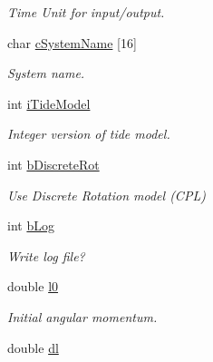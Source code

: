 \begin{DoxyCompactItemize}
\begin{DoxyCompactList}\small\item\em Time Unit for input/output. \end{DoxyCompactList}\item 
\hypertarget{struct_p_a_r_a_m_ad4a7df6fdd558d6fe9bbc6c3797d45d7}{}char \hyperlink{struct_p_a_r_a_m_ad4a7df6fdd558d6fe9bbc6c3797d45d7}{c\+System\+Name} \mbox{[}16\mbox{]}\label{struct_p_a_r_a_m_ad4a7df6fdd558d6fe9bbc6c3797d45d7}

\begin{DoxyCompactList}\small\item\em System name. \end{DoxyCompactList}\item 
\hypertarget{struct_p_a_r_a_m_ae7652abf8bba7206853f773eceb37e5e}{}int \hyperlink{struct_p_a_r_a_m_ae7652abf8bba7206853f773eceb37e5e}{i\+Tide\+Model}\label{struct_p_a_r_a_m_ae7652abf8bba7206853f773eceb37e5e}

\begin{DoxyCompactList}\small\item\em Integer version of tide model. \end{DoxyCompactList}\item 
\hypertarget{struct_p_a_r_a_m_aaf55dbd426e9edc0e77ae7139a7216e7}{}int \hyperlink{struct_p_a_r_a_m_aaf55dbd426e9edc0e77ae7139a7216e7}{b\+Discrete\+Rot}\label{struct_p_a_r_a_m_aaf55dbd426e9edc0e77ae7139a7216e7}

\begin{DoxyCompactList}\small\item\em Use Discrete Rotation model (C\+P\+L) \end{DoxyCompactList}\item 
\hypertarget{struct_p_a_r_a_m_afcb8dca240e755f4265686883f8d64a8}{}int \hyperlink{struct_p_a_r_a_m_afcb8dca240e755f4265686883f8d64a8}{b\+Log}\label{struct_p_a_r_a_m_afcb8dca240e755f4265686883f8d64a8}

\begin{DoxyCompactList}\small\item\em Write log file? \end{DoxyCompactList}\item 
\hypertarget{struct_p_a_r_a_m_abc6aa68d2d1110b3beffbc648d82fe6c}{}double \hyperlink{struct_p_a_r_a_m_abc6aa68d2d1110b3beffbc648d82fe6c}{l0}\label{struct_p_a_r_a_m_abc6aa68d2d1110b3beffbc648d82fe6c}

\begin{DoxyCompactList}\small\item\em Initial angular momentum. \end{DoxyCompactList}\item 
\hypertarget{struct_p_a_r_a_m_a9b00e73d16a7a404ca30921e754bf424}{}double \hyperlink{struct_p_a_r_a_m_a9b00e73d16a7a404ca30921e754bf424}{dl}\label{struct_p_a_r_a_m_a9b00e73d16a7a404ca30921e754bf424}


\end{DoxyCompactItemize}
